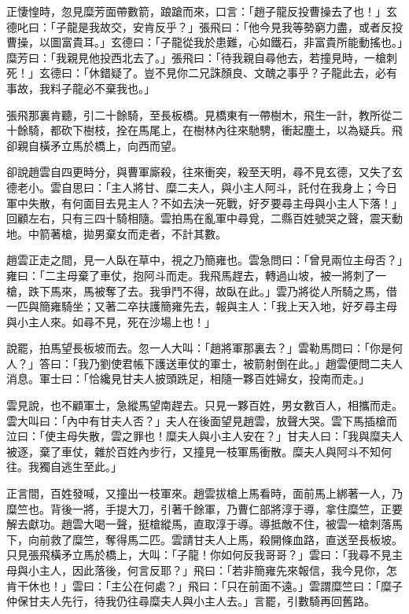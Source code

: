 正悽惶時，忽見糜芳面帶數箭，踉蹌而來，口言：「趙子龍反投曹操去了也！」玄德叱曰：「子龍是我故交，安肯反乎？」張飛曰：「他今見我等勢窮力盡，或者反投曹操，以圖富貴耳。」玄德曰：「子龍從我於患難，心如鐵石，非富貴所能動搖也。」糜芳曰：「我親見他投西北去了。」張飛曰：「待我親自尋他去，若撞見時，一槍刺死！」玄德曰：「休錯疑了。豈不見你二兄誅顏良、文醜之事乎？子龍此去，必有事故，我料子龍必不棄我也。」

張飛那裏肯聽，引二十餘騎，至長板橋。見橋東有一帶樹木，飛生一計，教所從二十餘騎，都砍下樹枝，拴在馬尾上，在樹林內往來馳騁，衝起塵土，以為疑兵。飛卻親自橫矛立馬於橋上，向西而望。

卻說趙雲自四更時分，與曹軍廝殺，往來衝突，殺至天明，尋不見玄德，又失了玄德老小。雲自思曰：「主人將甘、糜二夫人，與小主人阿斗，託付在我身上；今日軍中失散，有何面目去見主人？不如去決一死戰，好歹要尋主母與小主人下落！」回顧左右，只有三四十騎相隨。雲拍馬在亂軍中尋覓，二縣百姓號哭之聲，震天動地。中箭著槍，拋男棄女而走者，不計其數。

趙雲正走之間，見一人臥在草中，視之乃簡雍也。雲急問曰：「曾見兩位主母否？」雍曰：「二主母棄了車仗，抱阿斗而走。我飛馬趕去，轉過山坡，被一將刺了一槍，跌下馬來，馬被奪了去。我爭鬥不得，故臥在此。」雲乃將從人所騎之馬，借一匹與簡雍騎坐；又著二卒扶護簡雍先去，報與主人：「我上天入地，好歹尋主母與小主人來。如尋不見，死在沙場上也！」

說罷，拍馬望長板坡而去。忽一人大叫：「趙將軍那裏去？」雲勒馬問曰：「你是何人？」答曰：「我乃劉使君帳下護送車仗的軍士，被箭射倒在此。」趙雲便問二夫人消息。軍士曰：「恰纔見甘夫人披頭跣足，相隨一夥百姓婦女，投南而走。」

雲見說，也不顧軍士，急縱馬望南趕去。只見一夥百姓，男女數百人，相攜而走。雲大叫曰：「內中有甘夫人否？」夫人在後面望見趙雲，放聲大哭。雲下馬插槍而泣曰：「使主母失散，雲之罪也！糜夫人與小主人安在？」甘夫人曰：「我與糜夫人被逐，棄了車仗，雜於百姓內步行，又撞見一枝軍馬衝散。糜夫人與阿斗不知何往。我獨自逃生至此。」

正言間，百姓發喊，又撞出一枝軍來。趙雲拔槍上馬看時，面前馬上綁著一人，乃糜竺也。背後一將，手提大刀，引著千餘軍，乃曹仁部將淳于導，拿住糜竺，正要解去獻功。趙雲大喝一聲，挺槍縱馬，直取淳于導。導抵敵不住，被雲一槍刺落馬下，向前救了糜竺，奪得馬二匹。雲請甘夫人上馬，殺開條血路，直送至長板坡。只見張飛橫矛立馬於橋上，大叫：「子龍！你如何反我哥哥？」雲曰：「我尋不見主母與小主人，因此落後，何言反耶？」飛曰：「若非簡雍先來報信，我今見你，怎肯干休也！」雲曰：「主公在何處？」飛曰：「只在前面不遠。」雲謂糜竺曰：「糜子仲保甘夫人先行，待我仍往尋糜夫人與小主人去。」言罷，引數騎再回舊路。

